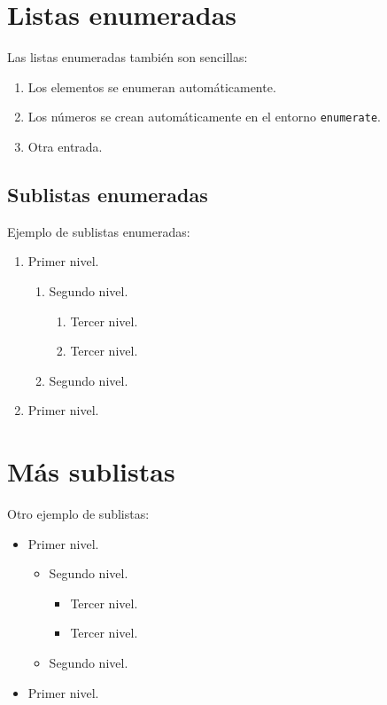 
\section{Listas enumeradas}

Las listas enumeradas también son sencillas:
\begin{enumerate}
  \item Los elementos se enumeran automáticamente.
  \item Los números se crean automáticamente en el entorno \texttt{enumerate}.
  \item Otra entrada.
\end{enumerate}


\subsection{Sublistas enumeradas}

Ejemplo de sublistas enumeradas:
\begin{enumerate}
  \item Primer nivel.
  \begin{enumerate}
    \item Segundo nivel.
    \begin{enumerate}
      \item Tercer nivel.
      \item Tercer nivel.
    \end{enumerate}
    \item Segundo nivel.
  \end{enumerate}
  \item Primer nivel.
\end{enumerate}


\section{Más sublistas}

Otro ejemplo de sublistas:
\begin{itemize}
  \item Primer nivel.
  \begin{itemize}
    \item Segundo nivel.
    \begin{itemize}
      \item Tercer nivel.
      \item Tercer nivel.
    \end{itemize}
    \item Segundo nivel.
  \end{itemize}
  \item Primer nivel.
\end{itemize}

